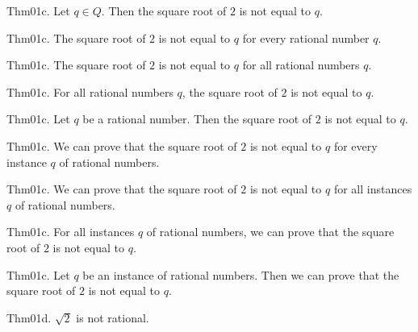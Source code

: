 \documentclass{article}
\begin{document}
Thm01c. Let $q \in Q$. Then the square root of $2$ is not equal to $q$.

Thm01c. The square root of $2$ is not equal to $q$ for every rational number $q$.

Thm01c. The square root of $2$ is not equal to $q$ for all rational numbers $q$.

Thm01c. For all rational numbers $q$, the square root of $2$ is not equal to $q$.

Thm01c. Let $q$ be a rational number. Then the square root of $2$ is not equal to $q$.

Thm01c. We can prove that the square root of $2$ is not equal to $q$ for every instance $q$ of rational numbers.

Thm01c. We can prove that the square root of $2$ is not equal to $q$ for all instances $q$ of rational numbers.

Thm01c. For all instances $q$ of rational numbers, we can prove that the square root of $2$ is not equal to $q$.

Thm01c. Let $q$ be an instance of rational numbers. Then we can prove that the square root of $2$ is not equal to $q$.

Thm01d. $\sqrt{ 2}$ is not rational.
\end{document}
